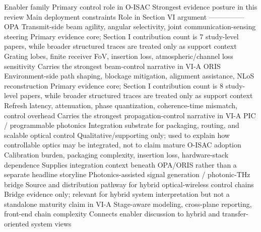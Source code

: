 {}\markdownRendererParagraphSeparator
{}\markdownRendererPipe{} Enabler family \markdownRendererPipe{} Primary control role in O-ISAC \markdownRendererPipe{} Strongest evidence posture in this review \markdownRendererPipe{} Main deployment constraints \markdownRendererPipe{} Role in Section VI argument \markdownRendererPipe{}\markdownRendererSoftLineBreak
{}\markdownRendererPipe{}---\markdownRendererPipe{}---\markdownRendererPipe{}---\markdownRendererPipe{}---\markdownRendererPipe{}---\markdownRendererPipe{}\markdownRendererSoftLineBreak
{}\markdownRendererPipe{} OPA \markdownRendererPipe{} Transmit-side beam agility, angular selectivity, joint communication-sensing steering \markdownRendererPipe{} Primary evidence core; Section I contribution count is 7 study-level papers, while broader structured traces are treated only as support context \markdownRendererPipe{} Grating lobes, finite receiver FoV, insertion loss, atmospheric/channel loss sensitivity \markdownRendererPipe{} Carries the strongest beam-control narrative in VI-A \markdownRendererPipe{}\markdownRendererSoftLineBreak
{}\markdownRendererPipe{} ORIS \markdownRendererPipe{} Environment-side path shaping, blockage mitigation, alignment assistance, NLoS reconstruction \markdownRendererPipe{} Primary evidence core; Section I contribution count is 8 study-level papers, while broader structured traces are treated only as support context \markdownRendererPipe{} Refresh latency, attenuation, phase quantization, coherence-time mismatch, control overhead \markdownRendererPipe{} Carries the strongest propagation-control narrative in VI-A \markdownRendererPipe{}\markdownRendererSoftLineBreak
{}\markdownRendererPipe{} PIC / programmable photonics \markdownRendererPipe{} Integration substrate for packaging, routing, and scalable optical control \markdownRendererPipe{} Qualitative/supporting only; used to explain how controllable optics may be integrated, not to claim mature O-ISAC adoption \markdownRendererPipe{} Calibration burden, packaging complexity, insertion loss, hardware-stack dependence \markdownRendererPipe{} Supplies integration context beneath OPA/ORIS rather than a separate headline storyline \markdownRendererPipe{}\markdownRendererSoftLineBreak
{}\markdownRendererPipe{} Photonics-assisted signal generation / photonic-THz bridge \markdownRendererPipe{} Source and distribution pathway for hybrid optical-wireless control chains \markdownRendererPipe{} Bridge evidence only; relevant for hybrid system interpretation but not a standalone maturity claim in VI-A \markdownRendererPipe{} Stage-aware modeling, cross-plane reporting, front-end chain complexity \markdownRendererPipe{} Connects enabler discussion to hybrid and transfer-oriented system views \markdownRendererPipe{}\markdownRendererParagraphSeparator
